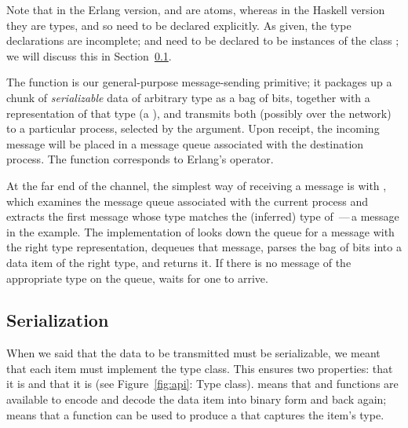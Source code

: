 \documentclass[preprint]{sigplanconf}
\begin{document}
Note that in the Erlang version,  and  are atoms, whereas in the Haskell version they are types, and so need to be declared explicitly. 
As given, the type declarations are incomplete;  and  need to be declared to be instances of the class ; we will discuss this in Section~\ref{s:serialization}.

The  function is our general-purpose message-sending primitive; it packages up a chunk of \emph{serializable} data of arbitrary type as a bag of bits, 
together with a representation of that type (a ), and transmits both (possibly over the network) to a particular process, selected by the  argument.
Upon receipt, the incoming message will be placed in a message queue associated with the destination process. 
The  function corresponds to Erlang's \textt{!} operator.

At the far end of the channel, the simplest way of receiving a message is with , which
examines the message queue associated with the current process and extracts the first message whose type matches the (inferred) type of \,---\,a  message in the example.  
The implementation of  looks down the queue for a message with the right type representation, 
dequeues that message, parses the bag of bits into a data item of the right type, and returns it.
If there is no message of the appropriate type on the queue,  waits for one to arrive.

\subsection{Serialization} 
\label{s:serialization}

When we said that the data to be transmitted must be serializable, we meant that each item must implement the  type class.  This ensures two properties: that it is  and that it is  (see Figure~\ref{fig:api}: Type class).
 means that  and  functions are available to encode and decode the data item into binary form and back again;  means that a function  can be used to produce a  that captures the item's type.  
\end{document}
